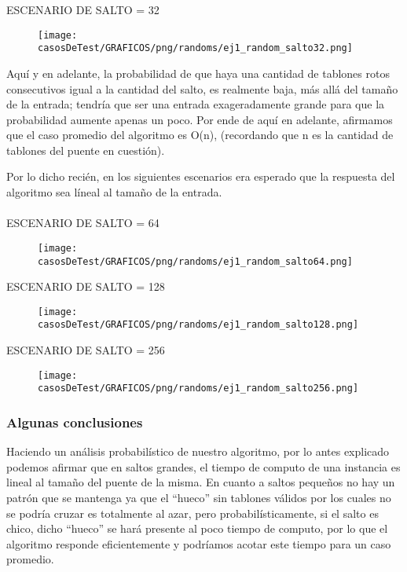 \newpage \indent ESCENARIO DE SALTO = 32
	\begin{figure}[h]
		\begin{center}
		   \texttt{[image: casosDeTest/GRAFICOS/png/randoms/ej1\_random\_salto32.png]}
		\end{center}
	\end{figure}

Aquí y en adelante, la probabilidad de que haya una cantidad de tablones rotos consecutivos igual a la cantidad del salto, es realmente baja, más allá del tamaño de la entrada; tendría que ser una entrada exageradamente grande para que la probabilidad aumente apenas un poco. Por ende de aquí en adelante, afirmamos que el caso promedio del algoritmo es O(n), (recordando que n es la cantidad de tablones del puente en cuestión).

Por lo dicho recién, en los siguientes escenarios era esperado que la respuesta del algoritmo sea líneal al tamaño de la entrada.\\ \\

\indent ESCENARIO DE SALTO = 64
	\begin{figure}[h]
		\begin{center}
		   \texttt{[image: casosDeTest/GRAFICOS/png/randoms/ej1\_random\_salto64.png]}
		\end{center}
	\end{figure}

\newpage \indent ESCENARIO DE SALTO = 128
	\begin{figure}[h]
		\begin{center}
		   \texttt{[image: casosDeTest/GRAFICOS/png/randoms/ej1\_random\_salto128.png]}
		\end{center}
	\end{figure}

\indent ESCENARIO DE SALTO = 256
	\begin{figure}[h]
		\begin{center}
		   \texttt{[image: casosDeTest/GRAFICOS/png/randoms/ej1\_random\_salto256.png]}
		\end{center}
	\end{figure}


\subsubsection{Algunas conclusiones}
Haciendo un análisis probabilístico de nuestro algoritmo, por lo antes explicado podemos afirmar que en saltos grandes, el tiempo de computo de una instancia es lineal al tamaño del puente de la misma.
En cuanto a saltos pequeños no hay un patrón que se mantenga ya que el “hueco” sin tablones válidos por los cuales no se podría cruzar es totalmente al azar, pero probabilísticamente, si el salto es chico, dicho “hueco” se hará presente al poco tiempo de computo, por lo que el algoritmo responde eficientemente y podríamos acotar este tiempo para un caso promedio.